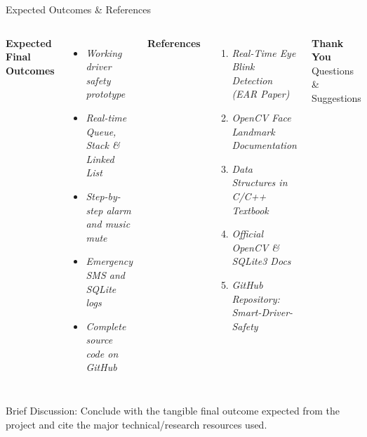\documentclass[aspectratio=169,11pt]{beamer}
\newcommand{\smallnote}[1]{%
\vspace{0.08cm}
{\scriptsize\color{GEUGrey}#1}
}
\newcommand{\placeholder}[1]{%
\textit{\color{GEUGrey}#1}
}
\begin{document}
\begin{frame}{Expected Outcomes \& References}

\begin{columns}[T,totalwidth=\textwidth]


\textbf{\color{GEUBlue}Expected Final Outcomes}

\begin{itemize}\itemsep3pt
\item \placeholder{Working driver safety prototype}
\item \placeholder{Real-time Queue, Stack \& Linked List}
\item \placeholder{Step-by-step alarm and music mute}
\item \placeholder{Emergency SMS and SQLite logs}
\item \placeholder{Complete source code on GitHub}
\end{itemize}


\textbf{\color{GEUBlue}References}

\begin{enumerate}\itemsep3pt
\item \placeholder{Real-Time Eye Blink Detection (EAR Paper)}
\item \placeholder{OpenCV Face Landmark Documentation}
\item \placeholder{Data Structures in C/C++ Textbook}
\item \placeholder{Official OpenCV \& SQLite3 Docs}
\item \placeholder{GitHub Repository: Smart-Driver-Safety}
\end{enumerate}

\vfill

\begin{center}

\colorbox{GEUBlue}{
\parbox{.78\textwidth}{
\centering
\color{white}
\textbf{Thank You}\\
Questions \& Suggestions
}}

\end{center}

\end{columns}

\vfill

\smallnote{
Brief Discussion: Conclude with the tangible final outcome expected
from the project and cite the major technical/research resources used.
}

\end{frame}
\end{document}
